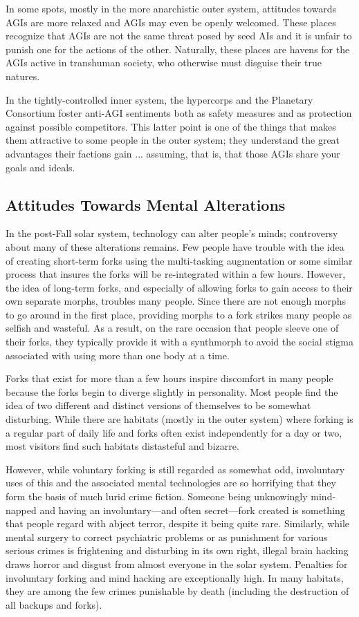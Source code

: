In some spots, mostly in the more anarchistic outer 
system, attitudes towards AGIs are more relaxed and 
AGIs may even be openly welcomed. These places 
recognize that AGIs are not the same threat posed by 
seed AIs and it is unfair to punish one for the actions 
of the other. Naturally, these places are havens for the 
AGIs active in transhuman society, who otherwise 
must disguise their true natures.

In the tightly-controlled inner system, the hypercorps
and the Planetary Consortium foster anti-AGI
sentiments both as safety measures and as protection 
against possible competitors. This latter point is one 
of the things that makes them attractive to some 
people in the outer system; they understand the great 
advantages their factions gain ... assuming, that is, 
that those AGIs share your goals and ideals.

\subsection{Attitudes Towards Mental Alterations}

In the post-Fall solar system, technology can alter people's
minds; controversy about many of these alterations
remains. Few people have trouble with the idea
of creating short-term forks using the multi-tasking 
augmentation or some similar process that insures 
the forks will be re-integrated within a few hours. 
However, the idea of long-term forks, and especially 
of allowing forks to gain access to their own separate 
morphs, troubles many people. Since there are not 
enough morphs to go around in the first place, providing
morphs to a fork strikes many people as selfish
and wasteful. As a result, on the rare occasion that 
people sleeve one of their forks, they typically provide 
it with a synthmorph to avoid the social stigma associated
with using more than one body at a time.

Forks that exist for more than a few hours inspire 
discomfort in many people because the forks begin to 
diverge slightly in personality. Most people find the 
idea of two different and distinct versions of themselves
to be somewhat disturbing. While there are
habitats (mostly in the outer system) where forking 
is a regular part of daily life and forks often exist independently
for a day or two, most visitors find such
habitats distasteful and bizarre.

However, while voluntary forking is still regarded 
as somewhat odd, involuntary uses of this and the 
associated mental technologies are so horrifying that 
they form the basis of much lurid crime fiction. Someone
being unknowingly mind-napped and having an
involuntary—and often secret—fork created is something
that people regard with abject terror, despite it
being quite rare. Similarly, while mental surgery to 
correct psychiatric problems or as punishment for 
various serious crimes is frightening and disturbing 
in its own right, illegal brain hacking draws horror 
and disgust from almost everyone in the solar system. 
Penalties for involuntary forking and mind hacking 
are exceptionally high. In many habitats, they are 
among the few crimes punishable by death (including 
the destruction of all backups and forks). 


